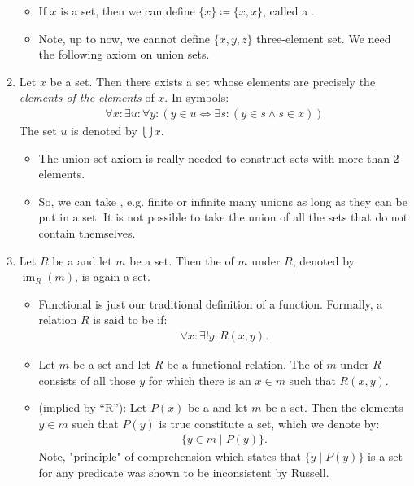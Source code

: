 \documentclass{article}
\begin{document}
\begin{enumerate}
\begin{itemize}
\item  If $x$ is a set, then we can define $\{x\}\coloneqq\{x, x\}$,  called a . 
\item Note, up to now, we cannot define $\{x,y,z\}$ three-element set. We need the following axiom on union sets.
\end{itemize}
\item {} Let $x$ be a set. Then there exists a set whose elements are precisely the \emph{elements of the elements} of $x$. In symbols:
\begin{align*}
\forall x: \exists u: \forall y:(y \in u \Leftrightarrow \exists s:(y \in s \wedge s \in x))
\end{align*}
The set $u$ is denoted by $\bigcup x$.
\begin{itemize}
    \item The union set axiom is really needed to construct sets with more than 2 elements.
    \item So, we can take , e.g. finite or infinite many unions as long as they can be put in a set. It is not possible to take the union of all the sets that do not contain themselves.
\end{itemize}
\item {} Let $R$ be a  and let $m$ be a set. Then the  of $m$ under $R$, denoted by $\operatorname{im}_{R}(m)$, is again a set.
\begin{itemize}
    \item Functional is just our traditional definition of a function. Formally, a relation $R$ is said to be  if:
\begin{align*}
\forall x: \exists ! y: R(x, y).
\end{align*}
\item Let $m$ be a set and let $R$ be a functional relation. The  of $m$ under $R$ consists of all those $y$ for which there is an $x \in m$ such that $R(x, y)$.
\item {} (implied by ``R''): Let $P(x)$ be a  and let $m$ be a set. Then the elements $y \in m$ such that $P(y)$ is true constitute a set, which we denote by:
\begin{align*}
\{y \in m \mid P(y)\} .
\end{align*}
Note, "principle" of  comprehension which states that $\{y \mid P(y)\}$ is a set for any predicate  was shown to be inconsistent by Russell. 

\end{itemize}
\end{enumerate}
\end{document}
